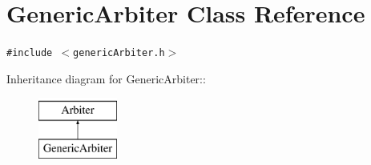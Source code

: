 \hypertarget{classGenericArbiter}{
\section{GenericArbiter Class Reference}
\label{classGenericArbiter}
}
{\tt \#include $<$genericArbiter.h$>$}

Inheritance diagram for GenericArbiter::\begin{figure}[H]
\begin{center}
\leavevmode
\includegraphics[height=2cm]{classGenericArbiter}
\end{center}
\end{figure}
